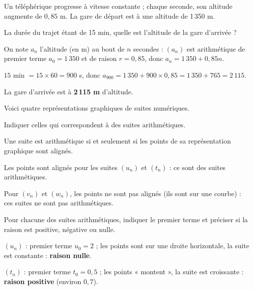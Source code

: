 \documentclass[12pt,a4paper]{book}
\begin{document}
\exerciceDS{}

Un téléphérique progresse à vitesse constante ; chaque seconde, son altitude augmente de $0,85$ m. La gare de départ est à une altitude de 1\,350 m.
\begin{itemMet}
	\item La durée du trajet étant de 15 min, quelle est l'altitude de la gare d'arrivée ?

	\begin{corrBox}
		On note $a_n$ l'altitude (en m) au bout de $n$ secondes : $(a_n)$ est arithmétique de premier terme $a_0=1\,350$ et de raison $r=0,85$, donc $a_n=1\,350+0,85n$.

		$15$ min $=15\times 60=900$ s, donc $a_{900}=1\,350+900\times 0,85=1\,350+765=2\,115$.

		La gare d'arrivée est à \textbf{2\,115 m} d'altitude.
	\end{corrBox}
\end{itemMet}

\exerciceDS{}

Voici quatre représentations graphiques de suites numériques.
\begin{enumMet}
	\item Indiquer celles qui correspondent à des suites arithmétiques.

	\begin{corrBox}
		Une suite est arithmétique si et seulement si les points de sa représentation graphique sont alignés.

		Les points sont alignés pour les suites $(u_n)$ et $(t_n)$ : ce sont des suites arithmétiques.

		Pour $(v_n)$ et $(w_n)$, les points ne sont pas alignés (ils sont sur une courbe) : ces suites ne sont pas arithmétiques.
	\end{corrBox}
	\item Pour chacune des suites arithmétiques, indiquer le premier terme et préciser si la raison est positive, négative ou nulle.

	\begin{corrBox}
		$(u_n)$ : premier terme $u_0=2$ ; les points sont sur une droite horizontale, la suite est constante : \textbf{raison nulle}.

		$(t_n)$ : premier terme $t_0=0,5$ ; les points « montent », la suite est croissante : \textbf{raison positive} (environ $0,7$).
	\end{corrBox}
\end{enumMet}
\end{document}
